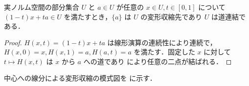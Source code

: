 \begin{example}[星形集合]
実ノルム空間の部分集合 $U$ と $a\in U$ が任意の $x\in U,t\in[0,1]$ について $(1-t)x+ta\in U$ を満たすとき，$\{a\}$ は $U$ の変形収縮先であり $U$ は道連結である．
\end{example}
\begin{proof}
$H(x,t)=(1-t)x+ta$ は線形演算の連続性により連続で，$H(x,0)=x,H(x,1)=a,H(a,t)=a$ を満たす．固定した $x$ に対して $t\mapsto H(x,t)$ は $x$ から $a$ への道であり  により任意の二点が結ばれる．
\end{proof}
中心への線分による変形収縮の模式図を  に示す．
